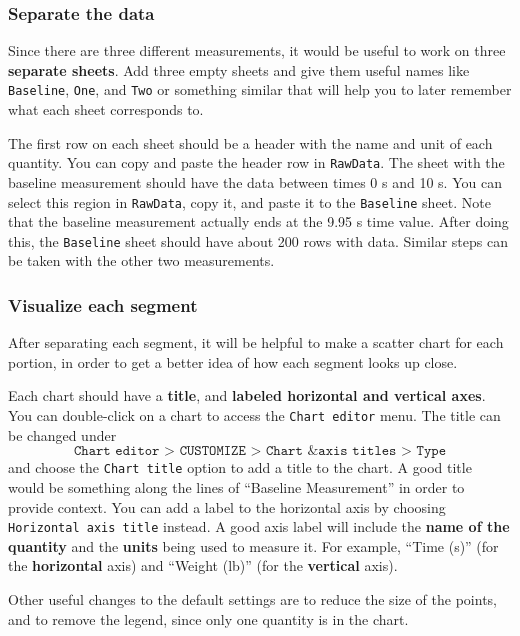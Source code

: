 \subsubsection{Separate the data}
%
Since there are three different measurements, it would be useful to work on three \textbf{separate sheets}. Add three empty sheets and give them useful names like \texttt{Baseline}, \texttt{One}, and \texttt{Two} or something similar that will help you to later remember what each sheet corresponds to.

The first row on each sheet should be a header with the name and unit of each quantity. You can copy and paste the header row in \texttt{RawData}. The sheet with the baseline measurement should have the data between times 0 s and 10 s. You can select this region in \texttt{RawData}, copy it, and paste it to the \texttt{Baseline} sheet. Note that the baseline measurement actually ends at the 9.95 s time value. After doing this, the \texttt{Baseline} sheet should have about 200 rows with data. Similar steps can be taken with the other two measurements.
%
\subsubsection{Visualize each segment}
%
After separating each segment, it will be helpful to make a scatter chart for each portion, in order to get a better idea of how each segment looks up close.

Each chart should have a \textbf{title}, and \textbf{labeled horizontal and vertical axes}. You can double-click on a chart to access the \texttt{Chart editor} menu. The title can be changed under
\begin{equation}
    \texttt{Chart editor > CUSTOMIZE > Chart \& axis titles > Type}
\end{equation}
and choose the \texttt{Chart title} option to add a title to the chart. A good title would be something along the lines of ``Baseline Measurement'' in order to provide context. You can add a label to the horizontal axis by choosing \texttt{Horizontal axis title} instead. A good axis label will include the \textbf{name of the quantity} and the \textbf{units} being used to measure it. For example, ``Time (s)'' (for the \textbf{horizontal} axis) and ``Weight (lb)'' (for the \textbf{vertical} axis).

Other useful changes to the default settings are to reduce the size of the points, and to remove the legend, since only one quantity is in the chart.
%
